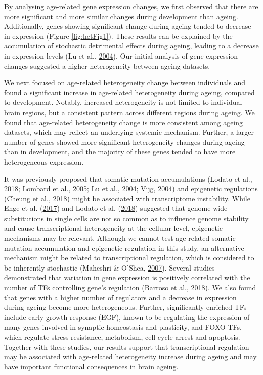 \documentclass[12pt,twoside]{unicam}
\begin{document}
By analysing age-related gene expression changes, we first observed that there are more significant and more similar changes during development than ageing. Additionally, genes showing significant change during ageing tended to decrease in expression (Figure \ref{fig:hetFig1}). These results can be explained by the accumulation of stochastic detrimental effects during ageing, leading to a decrease in expression levels (Lu et al., \protect\hyperlink{ref-Lu2004}{2004}). Our initial analysis of gene expression changes suggested a higher heterogeneity between ageing datasets.

We next focused on age-related heterogeneity change between individuals and found a significant increase in age-related heterogeneity during ageing, compared to development. Notably, increased heterogeneity is not limited to individual brain regions, but a consistent pattern across different regions during ageing. We found that age-related heterogeneity change is more consistent among ageing datasets, which may reflect an underlying systemic mechanism. Further, a larger number of genes showed more significant heterogeneity changes during ageing than in development, and the majority of these genes tended to have more heterogeneous expression.

It was previously proposed that somatic mutation accumulations (Lodato et al., \protect\hyperlink{ref-Lodato2018}{2018}; Lombard et al., \protect\hyperlink{ref-Lombard2005}{2005}; Lu et al., \protect\hyperlink{ref-Lu2004}{2004}; Vijg, \protect\hyperlink{ref-Vijg2004}{2004}) and epigenetic regulations (Cheung et al., \protect\hyperlink{ref-Cheung2018}{2018}) might be associated with transcriptome instability. While Enge et al. (\protect\hyperlink{ref-Enge2017}{2017}) and Lodato et al. (\protect\hyperlink{ref-Lodato2018}{2018}) suggested that genome-wide substitutions in single cells are not so common as to influence genome stability and cause transcriptional heterogeneity at the cellular level, epigenetic mechanisms may be relevant. Although we cannot test age-related somatic mutation accumulation and epigenetic regulation in this study, an alternative mechanism might be related to transcriptional regulation, which is considered to be inherently stochastic (Maheshri \& O'Shea, \protect\hyperlink{ref-Maheshri2007}{2007}). Several studies demonstrated that variation in gene expression is positively correlated with the number of TFs controlling gene's regulation (Barroso et al., \protect\hyperlink{ref-Barroso2018}{2018}). We also found that genes with a higher number of regulators and a decrease in expression during ageing become more heterogeneous. Further, significantly enriched TFs include early growth response (EGF), known to be regulating the expression of many genes involved in synaptic homeostasis and plasticity, and FOXO TFs, which regulate stress resistance, metabolism, cell cycle arrest and apoptosis. Together with these studies, our results support that transcriptional regulation may be associated with age-related heterogeneity increase during ageing and may have important functional consequences in brain ageing.
\end{document}
